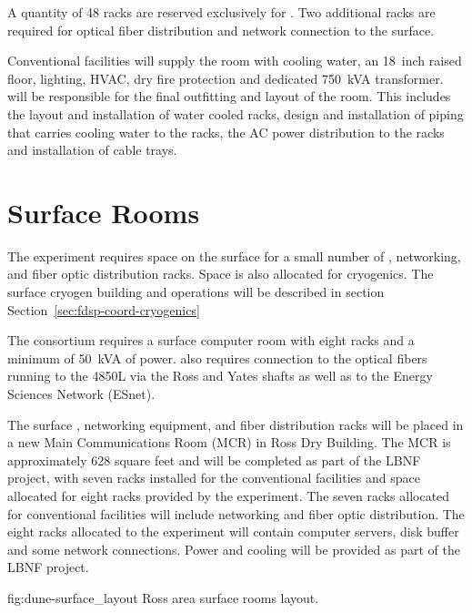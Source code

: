 A quantity of 48 racks are reserved exclusively for .  Two
additional racks are required for optical fiber distribution and
network connection to the surface.

Conventional facilities will supply the  room with cooling
water, an 18~inch raised floor, lighting, HVAC, dry fire protection
and dedicated 750~kVA transformer.   will be responsible for
the final outfitting and layout of the room.  This includes the layout
and installation of water cooled racks, design and installation of
piping that carries cooling water to the racks, the AC power
distribution to the racks and installation of cable trays.

\section{Surface Rooms}
\label{sec:fdsp-coord-surf-rooms}

The  experiment requires space on the surface for a small
number of , networking, and fiber optic distribution racks.  Space
is also allocated for cryogenics.  The surface cryogen building and
operations will be described in section
Section~\ref{sec:fdsp-coord-cryogenics}

The  consortium requires a surface computer room with eight
racks and a minimum of 50~kVA of power.   also requires connection
to the optical fibers running to the 4850L via the Ross and Yates
shafts as well as to the Energy Sciences Network (ESnet).

The surface , networking equipment, and fiber distribution racks
will be placed in a new Main Communications Room (MCR) in Ross Dry
Building.  The MCR is approximately 628 square feet and will be
completed as part of the LBNF project, with seven racks installed for
the conventional facilities and space allocated for eight racks
provided by the experiment.  The seven racks allocated for
conventional facilities will include networking and fiber optic
distribution.  The eight racks allocated to the experiment will
contain computer servers, disk buffer and some network connections.
Power and cooling will be provided as part of the LBNF project.
\begin{dunefigure}{fig:dune-surface_layout}
  {Ross area surface rooms layout.}
\end{dunefigure}

